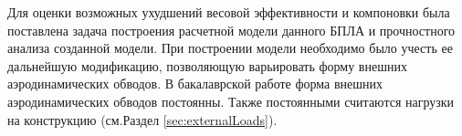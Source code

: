 Для оценки возможных ухудшений весовой эффективности и компоновки была поставлена задача построения расчетной модели данного БПЛА и прочностного анализа созданной модели. 
При построении модели необходимо было учесть ее дальнейшую модификацию, позволяющую варьировать форму внешних аэродинамических обводов. В бакалаврской работе форма внешних аэродинамических обводов постоянны. Также постоянными считаются нагрузки на конструкцию (см.Раздел \ref{sec:externalLoads}). 


 
  
  

%


